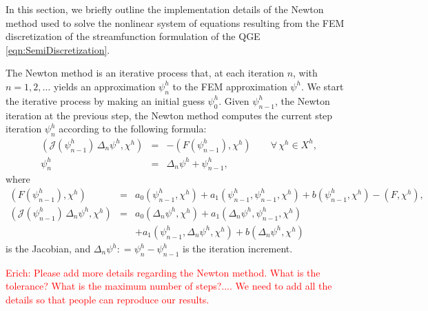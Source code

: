In this section, we briefly outline the implementation details of the Newton
method used to solve the nonlinear system of equations resulting from the FEM
discretization of the streamfunction formulation of the QGE
\eqref{eqn:SemiDiscretization}.

The Newton method is an iterative process that, at each iteration $n$, with $n=1, 2, \dots$ yields an approximation $\psi^h_n$ to the FEM approximation $\psi^h$.
We start the iterative process by making an initial guess $\psi^h_0$.
Given $\psi^h_{n-1}$, the Newton iteration at the previous step, the Newton method computes the current step iteration $\psi^h_n$ according to the following formula:
\begin{eqnarray}
  \left(
  \mathcal{J}(\psi^h_{n-1}) \, \Delta_n \psi^h , \chi^h
  \right)
  &=& -
  \left(
  F(\psi^h_{n-1}) , \chi^h
  \right)
  \qquad
  \forall \, \chi^h \in X^h ,
  \label{eqn:Newton} \\[0.2cm]
  \psi^h_n &=& \Delta_n \psi^h + \psi^h_{n-1},
  \label{eqn:NewPsi}
\end{eqnarray}
where
\begin{eqnarray*}
  \left(
  F(\psi^h_{n-1}) , \chi^h
  \right)
  &=&  a_0(\psi^h_{n-1},\chi^h) + a_1(\psi^h_{n-1},\psi^h_{n-1},\chi^h) + b(\psi^h_{n-1},\chi^h) - (F,\chi^h), \\[0.2cm]
  \left(
  \mathcal{J}(\psi^h_{n-1}) \, \Delta_n \psi^h , \chi^h
  \right)
  &=& a_0(\Delta_n \psi^h,\chi^h)
  + a_1(\Delta_n \psi^h,\psi^h_{n-1},\chi^h)
  \nonumber \\[0.2cm]
  && + a_1(\psi^h_{n-1},\Delta_n \psi^h,\chi^h)
  + b(\Delta_n \psi^h,\chi^h)
\end{eqnarray*}
is the Jacobian, and
$\Delta_n \psi^h : = \psi^h_n - \psi^h_{n-1}$ is the iteration increment.

\textcolor{red}{Erich: Please add more details regarding the Newton method.  What is the tolerance?  What is the maximum number of steps?.... We need to add all the details so that people can reproduce our results.}
